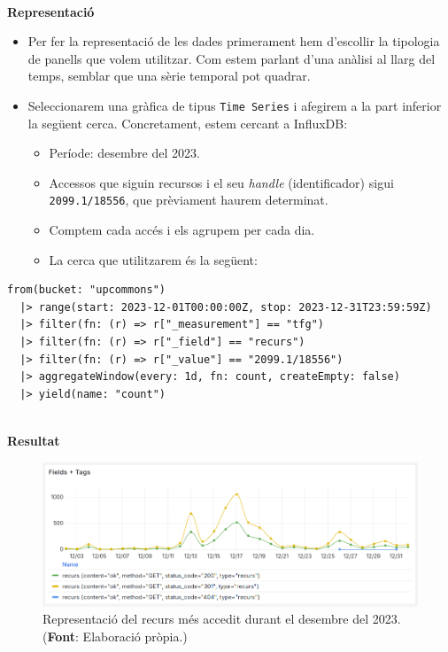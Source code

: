 \clearpage

\noindent \\
\textbf{Representació}

\begin{itemize}
    \item Per fer la representació de les dades primerament hem d'escollir la tipologia de panells que volem utilitzar.
    Com estem parlant d'una anàlisi al llarg del temps, semblar que una sèrie temporal pot quadrar.

    \item Seleccionarem una gràfica de tipus \texttt{Time Series} i afegirem a la part inferior la següent cerca.
    Concretament, estem cercant a InfluxDB:
    \begin{itemize}
        \item Període: desembre del 2023.
        \item Accessos que siguin recursos i el seu \textit{\gls{handle}} (identificador) sigui \texttt{2099.1/18556}, que prèviament haurem determinat.
        \item Comptem cada accés i els agrupem per cada dia.
        \item La cerca que utilitzarem és la següent:
    \end{itemize}
\end{itemize}

\noindent
\begin{verbatim}
from(bucket: "upcommons")
  |> range(start: 2023-12-01T00:00:00Z, stop: 2023-12-31T23:59:59Z)
  |> filter(fn: (r) => r["_measurement"] == "tfg")
  |> filter(fn: (r) => r["_field"] == "recurs")
  |> filter(fn: (r) => r["_value"] == "2099.1/18556")
  |> aggregateWindow(every: 1d, fn: count, createEmpty: false)
  |> yield(name: "count")
\end{verbatim}

\clearpage

\noindent \\
\textbf{Resultat}

\begin{figure}[htbp]
    \centerline{\includegraphics[width=\textwidth]{figures/most-accessed-resource}}
    \captionsetup{justification=centering}
    \caption[Representació del recurs més accedit durant el desembre del 2023.]{Representació del recurs més accedit durant el desembre del 2023. (\textbf{Font}: Elaboració pròpia.)}\label{fig:most-accessed-resource}
\end{figure}


